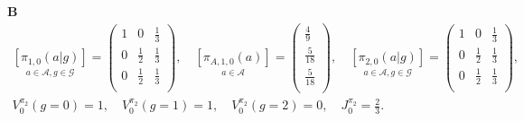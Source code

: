 \begin{example}
\vspace{1em}
\noindent{}\textbf{B}
$$
\begin{gathered}
\underset{a\in \mathcal{A}, g \in \mathcal{G}}{[\pi_{1,0}(a|g)]} =
\left(
\begin{array}{ccc}
1 & 0            & \frac{1}{3} \\
0 & \frac{1}{2}  & \frac{1}{3} \\
0 & \frac{1}{2}  & \frac{1}{3} \\
\end{array}
\right)
,\quad
\underset{a\in \mathcal{A}}{[\pi_{A,1,0}(a)]} =
\left(
\begin{array}{c}
\frac{4}{9} \\
\frac{5}{18} \\
\frac{5}{18}  \\
\end{array}
\right)
,\quad
\underset{a\in \mathcal{A},g\in \mathcal{G}}{[\pi_{2,0}(a|g)]} =
\left(
\begin{array}{ccc}
1 & 0 & \frac{1}{3} \\
0 & \frac{1}{2} & \frac{1}{3} \\
0 & \frac{1}{2} & \frac{1}{3} \\
\end{array}
\right)
,\\
V_{0}^{\pi_2}(g=0) = 1,\quad
V_{0}^{\pi_2}(g=1) = 1,\quad
V_{0}^{\pi_2}(g=2) = 0,\quad
J_{0}^{\pi_2} = \frac{2}{3}.
\end{gathered}
$$


\end{example}
